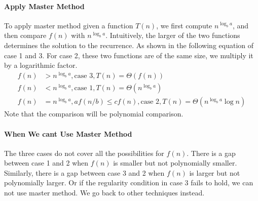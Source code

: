 \documentclass[a4paper,11pt]{book}
\begin{document}
\paragraph{Apply Master Method} To apply master method given a function $T(n)$, we first compute $n^{\log_b a}$, and then compare $f(n)$ with $n^{\log_b a}$. Intuitively, the larger of the two functions determines the solution to the recurrence. As shown in the following equation of case 1 and 3. For case 2, these two functions are of the same size, we multiply it by a logarithmic factor. 
\begin{align}
    f(n) &> n^{\log_b a}, \text{case 3}, T(n)= \Theta(f(n))\\
    f(n) &< n^{\log_b a}, \text{case 1}, T(n)=\Theta(n^{\log_b a})\\
f(n) &= n^{\log_b a}, a f(n/b)\leq cf(n), \text{case 2}, T(n)=\Theta(n^{\log_b a} \log n)
\end{align}
Note that the comparison will be polynomial comparison. 

\paragraph{When We cant Use Master Method} The three cases do not cover all the possibilities for $f(n)$. There is a gap between case 1 and 2 when $f(n)$ is smaller but not polynomially smaller. Similarly, there is a gap between case 3 and 2 when $f(n)$ is larger but not polynomially larger. Or if the regularity condition in case 3 fails to hold, we can not use master method. We go back to other techniques instead. 







\end{document}

